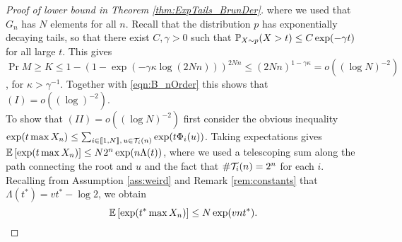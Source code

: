 \begin{proof}[Proof of lower bound in Theorem \ref{thm:ExpTails_BrunDer}]
where we used that $G_n$ has $N$ elements for all $n$. Recall that the distribution $p$ has exponentially decaying tails, so that there exist $C, \gamma > 0$ such that $\P_{X \sim p}(X > t) \leq C \exp(-\gamma t)$ for all large $t$. This gives $\Pr{M \geq K} \leq 1 - (1 - \exp(- \gamma \kappa \log(2Nn)))^{2Nn} \leq (2Nn)^{1-\gamma \kappa} = o((\log N)^{-2})$, for $\kappa > \gamma^{-1}$. Together with \ref{eqn:B_nOrder} this shows that $(I) = o((\log)^{-2})$. \\
To show that $(II) = o((\log N)^{-2})$ first consider the obvious inequality $\exp(t \max X_n) \leq \sum_{i \in \bbracket{1,N},\, u \in \cal{T}_i(n)} \exp(t \Phi_i(u))$. Taking expectations gives $\Ex{\exp(t \max X_n)} \leq N 2^n \exp(n \Lambda(t))$, where we used a telescoping sum along the path connecting the root and $u$ and the fact that $\# \cal{T}_i(n) = 2^n$ for each $i$. Recalling from Assumption \ref{ass:weird} and Remark \ref{rem:constants} that $\Lambda(t^*) = v t^* - \log 2$, we obtain
\begin{equation} \label{eqn:ExpTailT*bound}
\Ex{\exp(t^* \max X_n)} \leq N \exp( v n t^*).  
\end{equation}


\end{proof}
